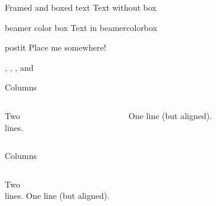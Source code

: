 \begin{frame}{Framed and boxed text}
  Text without box
  \begin{beamercolorbox}{beamer color box}
    Text in beamercolorbox
  \end{beamercolorbox}
  
  \begin{beamercolorbox}[sep=1em,wd=5cm]{postit}
    Place me somewhere!
  \end{beamercolorbox}
  
  , , , and 
\end{frame}


\begin{frame}{Columns}
  \begin{columns}[t]
    \begin{column}{5cm}
    Two\\lines.
    \end{column}
    \begin{column}{5cm}
    One line (but aligned).
    \end{column}
  \end{columns}
\end{frame}


\begin{frame}{Columns}
  \begin{columns}
    \column[t]{5cm}
      Two\\lines.
    \column[t]{5cm}
      One line (but aligned).
  \end{columns}
\end{frame}



